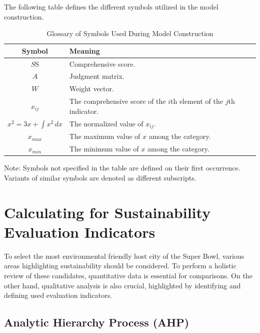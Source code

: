 \documentclass{mcmthesis}
\begin{document}
The following table defines the different symbols utilized in the model construction. 


\setlength{\tabcolsep}{8pt} 
\begin{center}
\begin{longtable}{cl}
\caption{Glossary of Symbols Used During Model Construction} 
\label{tab:symbols} \\

\toprule
\textbf{Symbol} & \textbf{Meaning} \\
\midrule
\endfirsthead

\bottomrule
\endlastfoot

$S$S & Comprehensive score. \\
$A$ & Judgment matrix. \\ 
$W$ & Weight vector. \\ 
$x_{ij}$ & The comprehensive score of the $i$th element of the $j$th indicator. \\ 
$x^2 = 3x + \int x^2 \, dx$ & The normalized value of $x_{ij}$. \\
$x_{max}$ & The maximum value of $x$ among the category. \\
$x_{min}$ & The minimum value of $x$ among the category. \\

\end{longtable}
\end{center}

Note: Symbols not specified in the table are defined on their first occurrence. Variants of similar symbols are denoted as different subscripts. 

\section{Calculating for Sustainability Evaluation Indicators} \label{sec:indicators}

To select the most environmental friendly host city of the Super Bowl, various areas highlighting sustainability should be considered. To perform a holistic review of these candidates, quantitative data is essential for comparisons. On the other hand, qualitative analysis is also crucial, highlighted by identifying and defining used evaluation indicators. 

\subsection{Analytic Hierarchy Process (AHP)}
\end{document}
